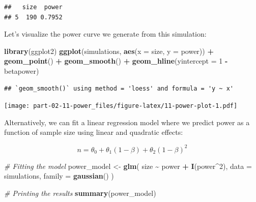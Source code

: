 \documentclass[
]{book}
\newenvironment{Shaded}{\begin{snugshade}}{\end{snugshade}}
\newcommand{\AttributeTok}[1]{\textcolor[rgb]{0.13,0.29,0.53}{#1}}
\newcommand{\CommentTok}[1]{\textcolor[rgb]{0.56,0.35,0.01}{\textit{#1}}}
\newcommand{\ConstantTok}[1]{\textcolor[rgb]{0.56,0.35,0.01}{#1}}
\newcommand{\DecValTok}[1]{\textcolor[rgb]{0.00,0.00,0.81}{#1}}
\newcommand{\FunctionTok}[1]{\textcolor[rgb]{0.13,0.29,0.53}{\textbf{#1}}}
\newcommand{\NormalTok}[1]{#1}
\newcommand{\OtherTok}[1]{\textcolor[rgb]{0.56,0.35,0.01}{#1}}
\newcommand{\SpecialCharTok}[1]{\textcolor[rgb]{0.81,0.36,0.00}{\textbf{#1}}}
\begin{document}
\begin{Shaded}
\end{Shaded}

\begin{verbatim}
##   size  power
## 5  190 0.7952
\end{verbatim}

Let's visualize the power curve we generate from this simulation:

\begin{Shaded}
\begin{Highlighting}[]
\FunctionTok{library}\NormalTok{(ggplot2)}
\FunctionTok{ggplot}\NormalTok{(simulations, }\FunctionTok{aes}\NormalTok{(}\AttributeTok{x =}\NormalTok{ size, }\AttributeTok{y =}\NormalTok{ power)) }\SpecialCharTok{+}
    \FunctionTok{geom\_point}\NormalTok{() }\SpecialCharTok{+}
    \FunctionTok{geom\_smooth}\NormalTok{() }\SpecialCharTok{+}
    \FunctionTok{geom\_hline}\NormalTok{(}\AttributeTok{yintercept =} \DecValTok{1} \SpecialCharTok{{-}}\NormalTok{ betapower)}
\end{Highlighting}
\end{Shaded}

\begin{verbatim}
## `geom_smooth()` using method = 'loess' and formula = 'y ~ x'
\end{verbatim}

\texttt{[image: part-02-11-power\_files/figure-latex/11-power-plot-1.pdf]}

Alternatively, we can fit a linear regression model where we predict power as a function of sample size using linear and quadratic effects:

\[
n = \theta_0 + \theta_1 (1 - \beta) + \theta_2 (1 - \beta)^2
\]

\begin{Shaded}
\begin{Highlighting}[]
\CommentTok{\# Fitting the model}
\NormalTok{power\_model }\OtherTok{\textless{}{-}} \FunctionTok{glm}\NormalTok{(}
\NormalTok{  size }\SpecialCharTok{\textasciitilde{}}\NormalTok{ power }\SpecialCharTok{+} \FunctionTok{I}\NormalTok{(power}\SpecialCharTok{\^{}}\DecValTok{2}\NormalTok{),}
  \AttributeTok{data =}\NormalTok{ simulations, }\AttributeTok{family =} \FunctionTok{gaussian}\NormalTok{()}
\NormalTok{)}

\CommentTok{\# Printing the results}
\FunctionTok{summary}\NormalTok{(power\_model)}
\end{Highlighting}
\end{Shaded}
\end{document}
